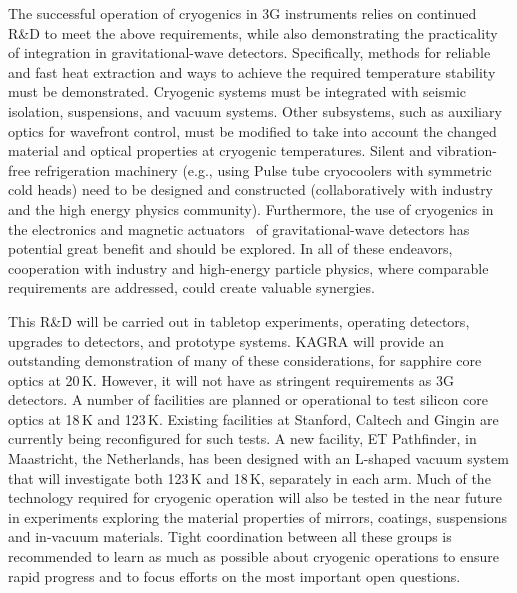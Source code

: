 The successful operation of cryogenics in 3G instruments relies on continued R\&D
to meet the above requirements, while also demonstrating the practicality of integration in gravitational-wave detectors. Specifically, methods for reliable and fast heat extraction and ways to achieve the required temperature stability must be demonstrated. Cryogenic systems must be integrated with seismic isolation, suspensions, and vacuum systems.  
Other subsystems, such as auxiliary optics for wavefront control, must be modified to take into account the changed material and optical properties at cryogenic temperatures. Silent and vibration-free refrigeration machinery (e.g., using Pulse tube cryocoolers with symmetric cold heads) need to be designed and constructed (collaboratively with industry and the high energy physics community). Furthermore, the use of cryogenics in the electronics and magnetic actuators~\cite{cryo:OSEM} of gravitational-wave detectors has potential great benefit and should be explored. In all of these endeavors, cooperation with industry and high-energy particle physics, where comparable requirements are addressed, could create valuable synergies. 


This R\&D will be carried out in tabletop experiments, operating detectors, upgrades to detectors, and prototype systems. KAGRA will provide an outstanding demonstration of many of these considerations, for sapphire core optics at 20\,K. However, it will not have as stringent requirements as 3G detectors.
A number of facilities are planned or operational to test silicon core optics at 18\,K and 123\,K. 
Existing facilities at Stanford, Caltech and Gingin are currently being reconfigured for such tests. A new facility, ET Pathfinder, in Maastricht, the Netherlands, has been designed with an L-shaped vacuum system that will investigate both 123\,K and  18\,K, separately in each arm. Much of the technology required for cryogenic operation will also be tested in the near future in experiments exploring the material properties of mirrors, coatings, suspensions and in-vacuum materials. Tight coordination between all these groups is recommended to learn as much as possible about cryogenic operations to ensure rapid progress and to focus efforts on the most important open questions.

